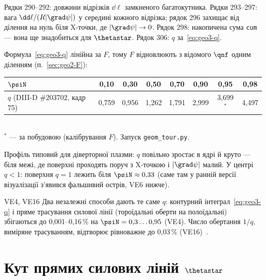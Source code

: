 
\noindent Рядки 290--292: довжини відрізків $\dd\ell$ замкненого багатокутника. Рядки 293--297: вага $\dd\ell/(R|\grad\psi|)$ у середині кожного відрізка; рядок 296 захищає від ділення на нуль біля X-точки, де $|\grad\psi|\to0$. Рядок 298: накопичена сума \texttt{cum} --- вона ще знадобиться для $\thetastar$. Рядок 306: $q$ за~\eqref{eq:geo3-q}.

Формула~\eqref{eq:geo3-q} лінійна за $F$, тому $F$ відновлюють з відомого $\qnf$ одним діленням (п.~\ref{sec:geo2-F}):


\begin{center}\small
\begin{tabular}{@{}lccccccc@{}}\toprule
$\psiN$ & 0,10 & 0,30 & 0,50 & 0,70 & 0,90 & 0,95 & 0,98\\\midrule
$q$ (DIII-D \#203702, кадр 75) & 0,759 & 0,956 & 1,262 & 1,791 & 2,999 & 3,699$^{*}$ & 4,497\\\bottomrule
\end{tabular}\\[2pt]
{\footnotesize $^{*}$ --- за побудовою (калібрування $F$). Запуск \texttt{geom\_tour.py}.}
\end{center}

Профіль типовий для діверторної плазми: $q$ повільно зростає в ядрі й круто --- біля межі, де поверхні проходять поруч з X-точкою і $|\grad\psi|$ малий. У центрі $q<1$: поверхня $q=1$ лежить біля $\psiN\approx0{,}33$ (саме там у ранній версії візуалізації з'явився фальшивий острів, VE6 нижче).

\begin{established}{VE4, VE16}
Два незалежні способи дають те саме $q$: контурний інтеграл~\eqref{eq:geo3-q} і пряме трасування силової лінії (тороїдальні оберти на полоїдальні) збігаються до 0,001--0,16\,\% на $\psiN=0{,}3\ldots0{,}95$ (VE4). Число обертання $1/q$, виміряне трасуванням, відтворює рівноважне до 0,03\,\% (VE16)~\cite{RegViz}.
\end{established}

\section{Кут прямих силових ліній $\thetastar$}\label{sec:geo3-thetastar}

